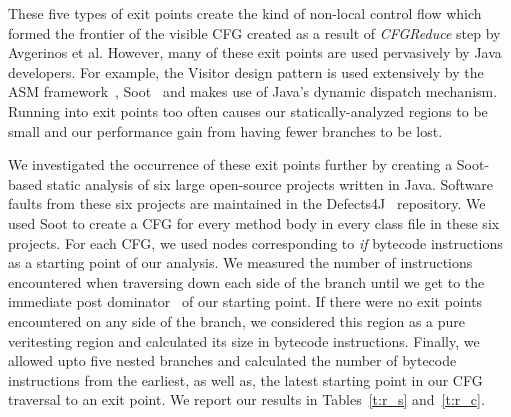These five types of exit points create the kind of non-local control flow which formed the frontier of the visible CFG created as a result of \textit{CFGReduce} step by Avgerinos et al.
%
However, many of these exit points are used pervasively by Java developers.
%
For example, the Visitor design pattern is used extensively by the ASM framework~\cite{asm}, Soot~\cite{soot} and makes use of Java\rq s dynamic dispatch mechanism.
%
Running into exit points too often causes our statically-analyzed regions to be small and our performance gain from having fewer branches to be lost.

We investigated the occurrence of these exit points further by creating a Soot-based static analysis of six large open-source projects written in Java.
%
Software faults from these six projects are maintained in the Defects4J~\cite{defects4j} repository.
%
We used Soot to create a CFG for every method body in every class file in these six projects.
%
For each CFG, we used nodes corresponding to \textit{if} bytecode instructions as a starting point of our analysis.
%
We measured the number of instructions encountered when traversing down each side of the branch until we get to the immediate post dominator~\cite{dragon-book} of our starting point.
%
If there were no exit points encountered on any side of the branch, we considered this region as a pure veritesting region and calculated its size in bytecode instructions.
%
Finally, we allowed upto five nested branches and calculated the number of bytecode instructions from the earliest, as well as, the latest starting point in our CFG traversal to an exit point.
%
We report our results in Tables~\ref{t:r_s} and~\ref{t:r_c}.

